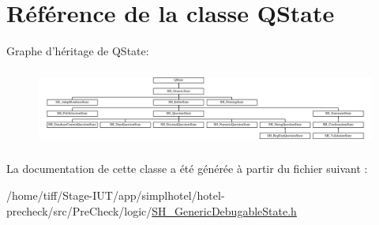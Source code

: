 \hypertarget{classQState}{\section{Référence de la classe Q\-State}
\label{classQState}
}
Graphe d'héritage de Q\-State\-:\begin{figure}[H]
\begin{center}
\leavevmode
\includegraphics[height=2.568807cm]{classQState}
\end{center}
\end{figure}


La documentation de cette classe a été générée à partir du fichier suivant \-:\begin{DoxyCompactItemize}
\item 
/home/tiff/\-Stage-\/\-I\-U\-T/app/simplhotel/hotel-\/precheck/src/\-Pre\-Check/logic/\hyperlink{SH__GenericDebugableState_8h}{S\-H\-\_\-\-Generic\-Debugable\-State.\-h}\end{DoxyCompactItemize}
